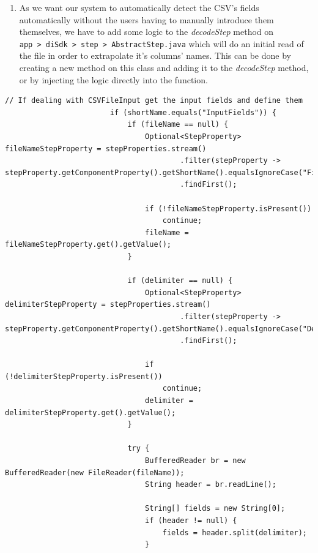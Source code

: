 \documentclass[
  11pt,
]{krantz}
\providecommand{\tightlist}{%
  \setlength{\itemsep}{0pt}\setlength{\parskip}{0pt}}
\begin{document}
\begin{enumerate}
\def\labelenumi{\arabic{enumi}.}
\setcounter{enumi}{4}
\tightlist
\item
  As we want our system to automatically detect the CSV's fields automatically without the users having to manually introduce them themselves, we have to add some logic to the \emph{decodeStep} method on \texttt{app\ \textgreater{}\ diSdk\ \textgreater{}\ step\ \textgreater{}\ AbstractStep.java} which will do an initial read of the file in order to extrapolate it's columns' names. This can be done by creating a new method on this class and adding it to the \emph{decodeStep} method, or by injecting the logic directly into the function.
\end{enumerate}

\begin{verbatim}
// If dealing with CSVFileInput get the input fields and define them
                        if (shortName.equals("InputFields")) {
                            if (fileName == null) {
                                Optional<StepProperty> fileNameStepProperty = stepProperties.stream()
                                        .filter(stepProperty -> stepProperty.getComponentProperty().getShortName().equalsIgnoreCase("Filename"))
                                        .findFirst();

                                if (!fileNameStepProperty.isPresent())
                                    continue;
                                fileName = fileNameStepProperty.get().getValue();
                            }

                            if (delimiter == null) {
                                Optional<StepProperty> delimiterStepProperty = stepProperties.stream()
                                        .filter(stepProperty -> stepProperty.getComponentProperty().getShortName().equalsIgnoreCase("Delimiter"))
                                        .findFirst();

                                if (!delimiterStepProperty.isPresent())
                                    continue;
                                delimiter = delimiterStepProperty.get().getValue();
                            }

                            try {
                                BufferedReader br = new BufferedReader(new FileReader(fileName));
                                String header = br.readLine();

                                String[] fields = new String[0];
                                if (header != null) {
                                    fields = header.split(delimiter);
                                }


\end{verbatim}
\end{document}
